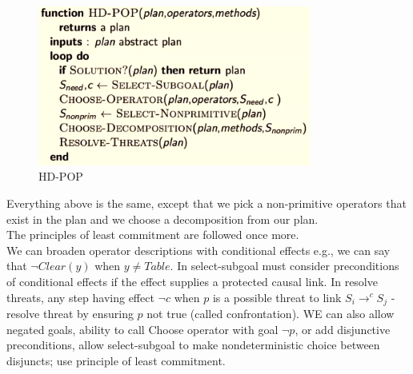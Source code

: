 \documentclass[a4paper]{article}
\theoremstyle{plain}
\theoremstyle{definition}
\theoremstyle{remark}
\begin{document}
\begin{figure}[H]
	\centering
	\includegraphics[width=0.8\textwidth]{hd.png}
	\caption{HD-POP}
	\label{fig:hd-png}
\end{figure}
Everything above is the same, except that we pick a non-primitive operators that exist in the plan and we choose a decomposition from our plan. \\
The principles of least commitment are followed once more.\\
We can broaden operator descriptions with conditional effects e.g., we can say that $\neg Clear(y)$ when $y\neq Table$. In select-subgoal must consider preconditions of conditional effects if the effect supplies a protected causal link. In resolve threats, any step having effect $\neg c$ when $p$ is a possible threat to link $S_i \to^{c} S_j$ - resolve threat by ensuring $p$ not true (called confrontation). WE can also allow negated goals, ability to call Choose operator with goal $\neg p$, or add disjunctive preconditions, allow select-subgoal to make nondeterministic choice between disjuncts; use principle of least commitment.
\end{document}
